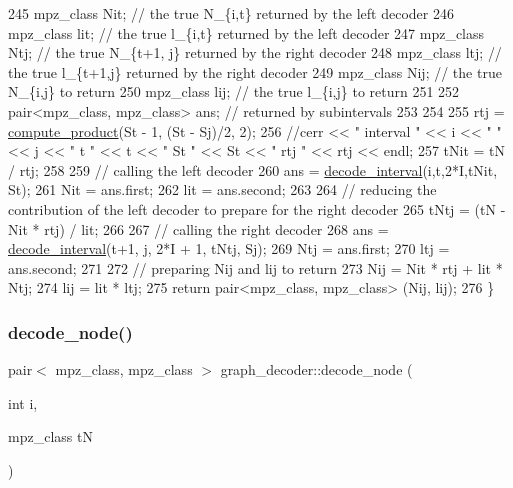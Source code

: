 \begin{DoxyCode}
245   mpz\_class Nit; \textcolor{comment}{// the true N\_\{i,t\} returned by the left decoder}
246   mpz\_class lit; \textcolor{comment}{// the true l\_\{i,t\} returned by the left decoder}
247   mpz\_class Ntj; \textcolor{comment}{// the true N\_\{t+1, j\} returned by the right decoder}
248   mpz\_class ltj; \textcolor{comment}{// the true l\_\{t+1,j\} returned by the right decoder}
249   mpz\_class Nij; \textcolor{comment}{// the true N\_\{i,j\} to return}
250   mpz\_class lij; \textcolor{comment}{// the true l\_\{i,j\} to return}
251 
252   pair<mpz\_class, mpz\_class> ans; \textcolor{comment}{// returned by subintervals }
253 
254 
255   rtj = \hyperlink{compression__helper_8cpp_ae2afb43aabe50f7d42aae8f82b5a35f4}{compute\_product}(St - 1, (St - Sj)/2, 2);
256   \textcolor{comment}{//cerr << " interval " << i << " " << j << " t " << t << " St " << St << " rtj " << rtj << endl;}
257   tNit = tN / rtj;
258 
259   \textcolor{comment}{// calling the left decoder }
260   ans = \hyperlink{classgraph__decoder_a2cb0bd279889a833d4c825e99eb72410}{decode\_interval}(i,t,2*I,tNit, St); 
261   Nit = ans.first;
262   lit = ans.second;
263 
264   \textcolor{comment}{// reducing the contribution of the left decoder to prepare for the right decoder}
265   tNtj = (tN - Nit * rtj) / lit;
266 
267   \textcolor{comment}{// calling the right decoder}
268   ans = \hyperlink{classgraph__decoder_a2cb0bd279889a833d4c825e99eb72410}{decode\_interval}(t+1, j, 2*I + 1, tNtj, Sj);
269   Ntj = ans.first;
270   ltj = ans.second;
271 
272   \textcolor{comment}{// preparing Nij and lij to return}
273   Nij = Nit * rtj + lit * Ntj;
274   lij = lit * ltj;
275   \textcolor{keywordflow}{return} pair<mpz\_class, mpz\_class> (Nij, lij);
276 \}
\end{DoxyCode}
\mbox{\label{classgraph__decoder_af3ff99a4de6035ad257ebd7c6519cdd8}} 
\subsubsection{\texorpdfstring{decode\+\_\+node()}{decode\_node()}}
{\footnotesize\ttfamily pair$<$ mpz\+\_\+class, mpz\+\_\+class $>$ graph\+\_\+decoder\+::decode\+\_\+node (\begin{DoxyParamCaption}\item[{int}]{i,  }\item[{mpz\+\_\+class}]{tN }\end{DoxyParamCaption})}



